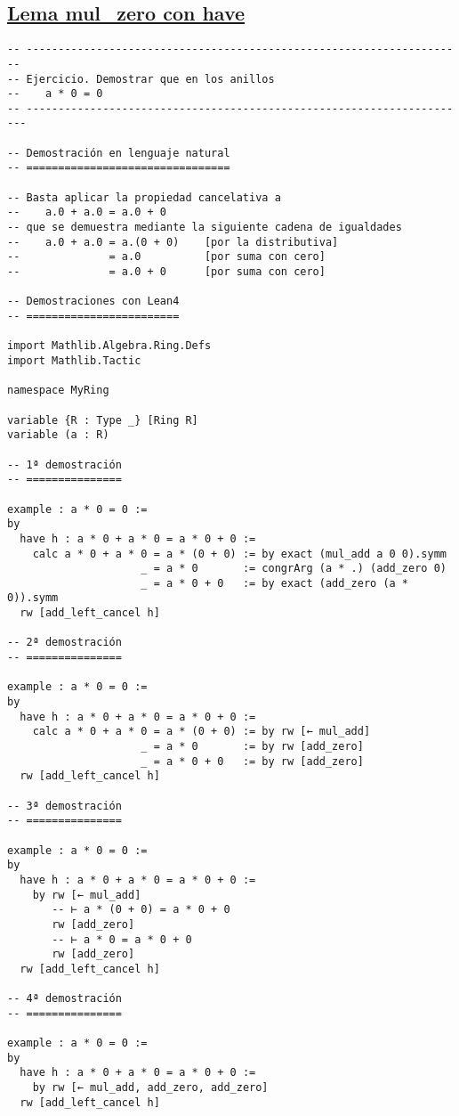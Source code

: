 \subsection{\href{./src/Basicos/mul\_zero.lean}{Lema mul\_zero con have}}
\label{sec:orgc49e086}
\begin{verbatim}
-- ---------------------------------------------------------------------
-- Ejercicio. Demostrar que en los anillos
--    a * 0 = 0
-- ----------------------------------------------------------------------

-- Demostración en lenguaje natural
-- ================================

-- Basta aplicar la propiedad cancelativa a
--    a.0 + a.0 = a.0 + 0
-- que se demuestra mediante la siguiente cadena de igualdades
--    a.0 + a.0 = a.(0 + 0)    [por la distributiva]
--              = a.0          [por suma con cero]
--              = a.0 + 0      [por suma con cero]

-- Demostraciones con Lean4
-- ========================

import Mathlib.Algebra.Ring.Defs
import Mathlib.Tactic

namespace MyRing

variable {R : Type _} [Ring R]
variable (a : R)

-- 1ª demostración
-- ===============

example : a * 0 = 0 :=
by
  have h : a * 0 + a * 0 = a * 0 + 0 :=
    calc a * 0 + a * 0 = a * (0 + 0) := by exact (mul_add a 0 0).symm
                     _ = a * 0       := congrArg (a * .) (add_zero 0)
                     _ = a * 0 + 0   := by exact (add_zero (a * 0)).symm
  rw [add_left_cancel h]

-- 2ª demostración
-- ===============

example : a * 0 = 0 :=
by
  have h : a * 0 + a * 0 = a * 0 + 0 :=
    calc a * 0 + a * 0 = a * (0 + 0) := by rw [← mul_add]
                     _ = a * 0       := by rw [add_zero]
                     _ = a * 0 + 0   := by rw [add_zero]
  rw [add_left_cancel h]

-- 3ª demostración
-- ===============

example : a * 0 = 0 :=
by
  have h : a * 0 + a * 0 = a * 0 + 0 :=
    by rw [← mul_add]
       -- ⊢ a * (0 + 0) = a * 0 + 0
       rw [add_zero]
       -- ⊢ a * 0 = a * 0 + 0
       rw [add_zero]
  rw [add_left_cancel h]

-- 4ª demostración
-- ===============

example : a * 0 = 0 :=
by
  have h : a * 0 + a * 0 = a * 0 + 0 :=
    by rw [← mul_add, add_zero, add_zero]
  rw [add_left_cancel h]


\end{verbatim}
